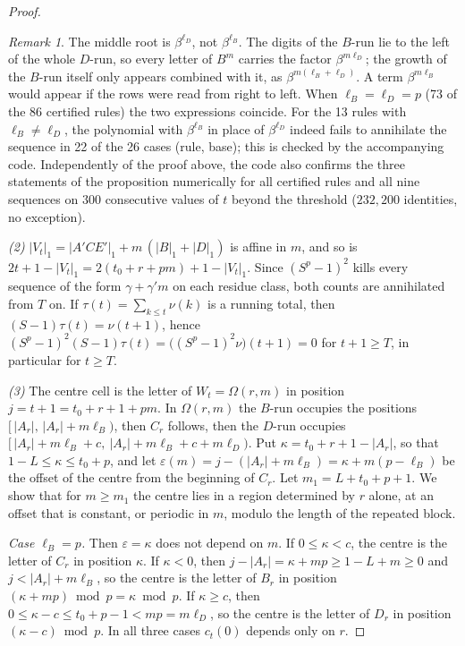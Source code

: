 \documentclass[11pt]{article}
\theoremstyle{definition}
\theoremstyle{remark}
\newtheorem{remark}[theorem]{Remark}
\begin{document}
\begin{proof}
\begin{remark}\label{rem:lD}
The middle root is $\beta^{\ell_D}$, not $\beta^{\ell_B}$. The digits of the $B$-run lie to the left of the whole $D$-run, so every letter of $B^m$ carries the factor $\beta^{m\ell_D}$; the growth of the $B$-run itself only appears combined with it, as $\beta^{m(\ell_B+\ell_D)}$. A term $\beta^{m\ell_B}$ would appear if the rows were read from right to left. When $\ell_B=\ell_D=p$ (73 of the 86 certified rules) the two expressions coincide. For the 13 rules with $\ell_B\neq\ell_D$, the polynomial with $\beta^{\ell_B}$ in place of $\beta^{\ell_D}$ indeed fails to annihilate the sequence in 22 of the 26 cases (rule, base); this is checked by the accompanying code. Independently of the proof above, the code also confirms the three statements of the proposition numerically for all certified rules and all nine sequences on $300$ consecutive values of $t$ beyond the threshold ($232{,}200$ identities, no exception).
\end{remark}

\emph{(2)} $|V_t|_1=|A'CE'|_1+m\,(|B|_1+|D|_1)$ is affine in $m$, and so is $2t+1-|V_t|_1=2(t_0+r+pm)+1-|V_t|_1$. Since $(S^p-1)^2$ kills every sequence of the form $\gamma+\gamma'm$ on each residue class, both counts are annihilated from $T$ on. If $\tau(t)=\sum_{k\le t}\nu(k)$ is a running total, then $(S-1)\tau(t)=\nu(t+1)$, hence $(S^p-1)^2(S-1)\tau(t)=\bigl((S^p-1)^2\nu\bigr)(t+1)=0$ for $t+1\ge T$, in particular for $t\ge T$.

\emph{(3)} The centre cell is the letter of $W_t=\Omega(r,m)$ in position $j=t+1=t_0+r+1+pm$. In $\Omega(r,m)$ the $B$-run occupies the positions $[\,|A_r|,\,|A_r|+m\ell_B)$, then $C_r$ follows, then the $D$-run occupies $[\,|A_r|+m\ell_B+c,\ |A_r|+m\ell_B+c+m\ell_D)$. Put $\kappa=t_0+r+1-|A_r|$, so that $1-L\le\kappa\le t_0+p$, and let $\varepsilon(m)=j-(|A_r|+m\ell_B)=\kappa+m(p-\ell_B)$ be the offset of the centre from the beginning of $C_r$. Let $m_1=L+t_0+p+1$. We show that for $m\ge m_1$ the centre lies in a region determined by $r$ alone, at an offset that is constant, or periodic in $m$, modulo the length of the repeated block.

\emph{Case $\ell_B=p$.} Then $\varepsilon=\kappa$ does not depend on $m$. If $0\le\kappa<c$, the centre is the letter of $C_r$ in position $\kappa$. If $\kappa<0$, then $j-|A_r|=\kappa+mp\ge 1-L+m\ge0$ and $j<|A_r|+m\ell_B$, so the centre is the letter of $B_r$ in position $(\kappa+mp)\bmod p=\kappa\bmod p$. If $\kappa\ge c$, then $0\le\kappa-c\le t_0+p-1<mp=m\ell_D$, so the centre is the letter of $D_r$ in position $(\kappa-c)\bmod p$. In all three cases $c_t(0)$ depends only on $r$.


\end{proof}
\end{document}
